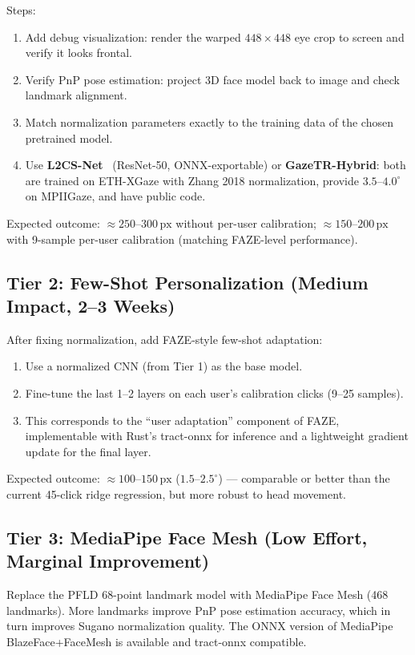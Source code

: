 \documentclass[11pt,a4paper]{article}
\begin{document}
Steps:
\begin{enumerate}
  \item Add debug visualization: render the warped $448\times448$ eye crop to screen and verify it looks frontal.
  \item Verify PnP pose estimation: project 3D face model back to image and check landmark alignment.
  \item Match normalization parameters exactly to the training data of the chosen pretrained model.
  \item Use \textbf{L2CS-Net}~\cite{abdelrahman2022l2cs} (ResNet-50, ONNX-exportable) or \textbf{GazeTR-Hybrid}: both are trained on ETH-XGaze with Zhang 2018 normalization, provide $3.5$--$4.0^\circ$ on MPIIGaze, and have public code.
\end{enumerate}

Expected outcome: ${\approx}250$--$300\,\text{px}$ without per-user calibration; ${\approx}150$--$200\,\text{px}$ with 9-sample per-user calibration (matching FAZE-level performance).

\subsection{Tier 2: Few-Shot Personalization (Medium Impact, 2--3 Weeks)}

After fixing normalization, add FAZE-style few-shot adaptation:
\begin{enumerate}
  \item Use a normalized CNN (from Tier 1) as the base model.
  \item Fine-tune the last 1--2 layers on each user's calibration clicks (9--25 samples).
  \item This corresponds to the ``user adaptation'' component of FAZE, implementable with Rust's tract-onnx for inference and a lightweight gradient update for the final layer.
\end{enumerate}

Expected outcome: ${\approx}100$--$150\,\text{px}$ ($1.5$--$2.5^\circ$) --- comparable or better than the current 45-click ridge regression, but more robust to head movement.

\subsection{Tier 3: MediaPipe Face Mesh (Low Effort, Marginal Improvement)}

Replace the PFLD 68-point landmark model with MediaPipe Face Mesh (468 landmarks).
More landmarks improve PnP pose estimation accuracy, which in turn improves Sugano normalization quality.
The ONNX version of MediaPipe BlazeFace+FaceMesh is available and tract-onnx compatible.
\end{document}
